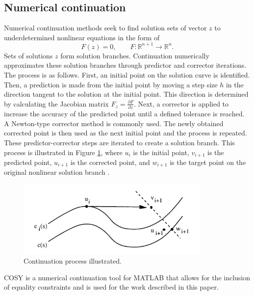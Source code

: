 \documentclass[12pt]{article}
\begin{document}
\subsection{Numerical continuation}
\label{continuation}
Numerical continuation methods seek to find solution sets of vector $z$ to underdetermined nonlinear equations in the form of 
\begin{equation}
\label{eq1}
F(z)=0, \qquad F:\mathbb{R}^{n+1} \to \mathbb{R}^n.
\end{equation}
Sets of solutions $z$ form solution branches. Continuation numerically approximates these solution branches through predictor and corrector iterations. The process is as follows. First, an initial point on the solution curve is identified. Then, a prediction is made from the initial point by moving a step size $h$ in the direction tangent to the solution at the initial point. This direction is determined by calculating the Jacobian matrix $F_z=\frac{\partial F}{\partial z}$. Next, a corrector is applied to increase the accuracy of the predicted point until a defined tolerance is reached. A Newton-type corrector method is commonly used. The newly obtained corrected point is then used as the next initial point and the process is repeated. These predictor-corrector steps are iterated to create a solution branch. This process is illustrated in Figure \ref{continuation_allgower}, where $u_i$ is the initial point, $v_{i+1}$ is the predicted point, $u_{i+1}$ is the corrected point, and $w_{i+1}$ is the target point on the original nonlinear solution branch \cite{allgower}.

\begin{figure}[h]
\begin{center}
 \includegraphics[width=3.75in]{continuation_allgower.png}
 \caption{Continuation process illustrated.}
 \label{continuation_allgower}
 \end{center}
\end{figure}

COSY \cite{spetzler} is a numerical continuation tool for MATLAB that allows for the inclusion of equality constraints and is used for the work described in this paper. 
\end{document}
